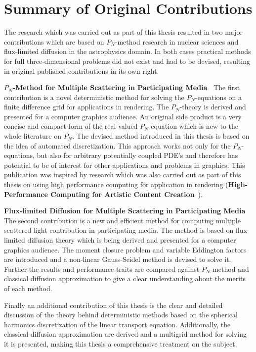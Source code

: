 \section{Summary of Original Contributions}

The research which was carried out as part of this thesis resulted in two major contributions which are based on $P_N$-method research in nuclear sciences and flux-limited diffusion in the astrophysics domain. In both cases practical methods for full three-dimensional problems did not exist and had to be devised, resulting in original published contributions in its own right.

\textbf{$P_N$-Method for Multiple Scattering in Participating Media~\cite{Koerner18}} The first contribution is a novel deterministic method for solving the $P_N$-equations on a finite difference grid for applications in rendering. The $P_N$-theory is derived and presented for a computer graphics audience. An original side product is a very concise and compact form of the real-valued $P_N$-equation which is new to the whole literature on $P_N$. The devised method introduced in this thesis is based on the idea of automated discretization. This approach works not only for the $P_N$-equations, but also for arbitrary potentially coupled PDE's and therefore has potential to be of interest for other applications and problems in graphics. This publication was inspired by research which was also carried out as part of this thesis on using high performance computing for application in rendering (\textbf{High-Performance Computing for Artistic Content Creation}~\cite{Koerner17}).

\textbf{Flux-limited Diffusion for Multiple Scattering in Participating Media~\cite{Koerner14}} The second contribution is a new and efficient method for computing multiple scattered light contribution in participating media. The method is based on flux-limited diffusion theory which is being derived and presented for a computer graphics audience. The moment closure problem and variable Eddington factors are introduced and a non-linear Gauss-Seidel method is devised to solve it. Further the results and performance traits are compared against $P_N$-method and classical diffusion approximation to give a clear understanding about the merits of each method.

Finally an additional contribution of this thesis is the clear and detailed discussion of the theory behind deterministic methods based on the spherical harmonics discretization of the linear transport equation. Additionally, the classical diffusion approximation are derived and a multigrid method for solving it is presented, making this thesis a comprehensive treatment on the subject.

